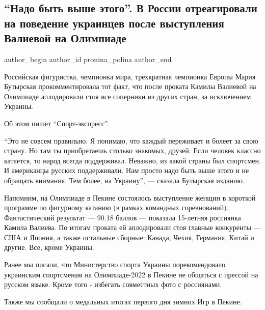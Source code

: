  
 
 
 
 
 
\subsection{\enquote{Надо быть выше этого}. В России отреагировали на поведение украинцев после выступления Валиевой на Олимпиаде}
\label{sec:06_02_2022.stz.news.ua.strana.1.byt_vyshe_etogo}
 
\ifcmt
 author_begin
   author_id pronina_polina
 author_end
\fi

Российская фигуристка, чемпионка мира, трехкратная чемпионка Европы Мария
Бутырская прокомментировала тот факт, что после проката Камилы Валиевой на
Олимпиаде аплодировали стоя все соперники из других стран, за исключением
Украины.


Об этом пишет \enquote{Спорт-экспресс}. 

\enquote{Это не совсем правильно. Я понимаю, что каждый переживает и болеет за свою
страну. Но там ты приобретаешь столько знакомых, друзей. Если человек классно
катается, то народ всегда поддерживал. Неважно, из какой страны был спортсмен.
И американцы русских поддерживали. Нам просто надо быть выше этого и не
обращать внимания. Тем более, на Украину}, — сказала Бутырская изданию.

Напомним, на Олимпиаде в Пекине состоялось выступление женщин в короткой
программе по фигурному катанию (в рамках командных соревнований).
Фантастический результат — 90.18 баллов — показала 15-летняя россиянка Камила
Валиева. По итогам проката ей аплодировали стоя главные конкуренты — США и
Япония, а также остальные сборные: Канада, Чехия, Германия, Китай и другие.
Все, кроме Украины.

Ранее мы писали, что Министерство спорта Украины порекомендовало украинским
спортсменам на Олимпиаде-2022 в Пекине не общаться с прессой на русском языке.
Кроме того - избегать совместных фото с россиянами.

Также мы сообщали о медальных итогах первого дня зимних Игр в Пекине.
